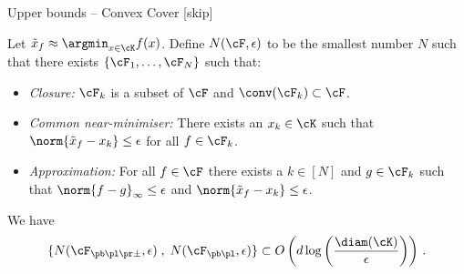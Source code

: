 
\begin{frame}{Upper bounds -- Convex Cover [skip]}
    \small
    \begin{tcolorbox}[title=Convex cover (informal),colback=green!5!white,colframe=green!50!black]
        Let $\tilde{x}_f \approx \argmin_{x\in \cK} f(x)$. Define $N(\cF, \epsilon)$ to be the smallest number $N$ such that there exists $\{\cF_1,\ldots,\cF_N\}$
        such that:
        \begin{itemize}
            \item \textit{Closure:} $\cF_k$ is a subset of $\cF$ and $\conv(\cF_k) \subset \cF$.
            \item \textit{Common near-minimiser:} There exists an $x_k \in \cK$ such that $\norm{\tilde x_f - x_k} \leq \epsilon$ for all $f \in \cF_k$.
            \item \textit{Approximation:} For all $f \in \cF$ there exists a $k \in [N]$ and $g \in \cF_k$ such that $\norm{f - g}_\infty \leq \epsilon$
                  and $\norm{\tilde x_f - x_k} \leq \epsilon$.
        \end{itemize}
    \end{tcolorbox}
    \begin{tcolorbox}[title=Proposition 2 -- Convex covering number ,colback=blue!5!white,colframe=blue!50!black]
        We have
        \[
            \{N(\cF_{\pb\pl\pr\pm}, \epsilon)\;,\; N(\cF_{\pb\pl}, \epsilon)\} \subset O\left(d\log\left(\frac{\diam(\cK)}{\epsilon}\right)\right)\,.
        \]
    \end{tcolorbox}
\end{frame}
